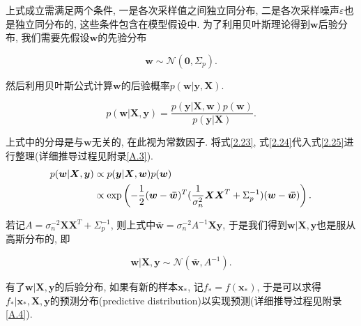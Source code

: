                 上式成立需满足两个条件, 一是各次采样值之间独立同分布, 二是各次采样噪声$\varepsilon$也是独立同分布的, 这些条件包含在模型假设中. 为了利用贝叶斯理论得到$\boldsymbol{w}$后验分布, 我们需要先假设$\boldsymbol{w}$的先验分布

                \begin{equation}\label{2.24}
                    \boldsymbol{w}\sim\mathcal{N}(\boldsymbol{0},\Sigma_{p}).
                \end{equation}

                然后利用贝叶斯公式计算$\boldsymbol{w}$的后验概率$p(\boldsymbol{w}|\boldsymbol{y},\boldsymbol{X})$.

                \begin{equation}\label{2.25}
                    p(\boldsymbol{w}|\boldsymbol{X},\boldsymbol{y})=\frac{p(\boldsymbol{y}|\boldsymbol{X},\boldsymbol{w})p(\boldsymbol{w})}{p(\boldsymbol{y}|\boldsymbol{X})}.
                \end{equation}

                上式中的分母是与$\boldsymbol{w}$无关的, 在此视为常数因子. 将式\ref{2.23}, 式\ref{2.24}代入式\ref{2.25}进行整理(详细推导过程见附录\ref{A.3}).
                \begin{align}\label{2.26}
                    p(\boldsymbol{w}|\boldsymbol{X},\boldsymbol{y})
                    &\propto p(\boldsymbol{y}|\boldsymbol{X},\boldsymbol{w})p(\boldsymbol{w}) \notag\\
                    &\propto \mathrm{exp}\left(-\frac{1}{2}(\boldsymbol{w}-\boldsymbol{\bar{w}})^{T}(\frac{1}{\sigma^{2}_{n}}\boldsymbol{X}\boldsymbol{X}^{T}+\Sigma^{-1}_{p})(\boldsymbol{w}-\boldsymbol{\bar{w}})\right).
                \end{align}

                若记$A=\sigma^{-2}_{n}\boldsymbol{XX}^{T}+\Sigma^{-1}_{p}$, 则上式中$\boldsymbol{\bar{w}}=\sigma^{-2}_{n}A^{-1}\boldsymbol{Xy}$, 于是我们得到$\boldsymbol{w}|\boldsymbol{X},\boldsymbol{y}$也是服从高斯分布的, 即

                \begin{equation}\label{2.27}
                    \boldsymbol{w}|\boldsymbol{X},\boldsymbol{y}\sim\mathcal{N}(\boldsymbol{\bar{w}},A^{-1}).
                \end{equation}

                有了$\boldsymbol{w}|\boldsymbol{X},\boldsymbol{y}$的后验分布, 如果有新的样本$\boldsymbol{x}_{*}$, 记$f_{*}=f(\boldsymbol{x}_{*})$, 于是可以求得$f_{*}|\boldsymbol{x}_{*},\boldsymbol{X},\boldsymbol{y}$的预测分布(predictive distribution)以实现预测(详细推导过程见附录\ref{A.4}).

